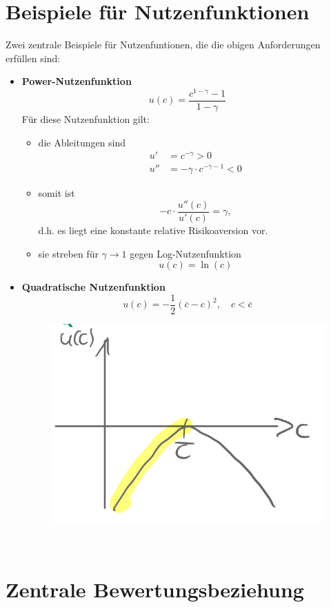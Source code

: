 \documentclass[12pt]{extreport} %
\theoremstyle{named}
\theoremstyle{nnamed}
\theoremstyle{itshape}
\theoremstyle{normal}
\begin{document}
\section{Beispiele für Nutzenfunktionen}
Zwei zentrale Beispiele für Nutzenfuntionen, die die obigen Anforderungen erfüllen sind:
\begin{itemize}
	\item \textbf{Power-Nutzenfunktion}
			$$ u(c) = \frac{c^{1-\gamma} - 1}{1 - \gamma} $$
			Für diese Nutzenfunktion gilt:
		\begin{itemize}
			\item die Ableitungen sind
				\begin{align*}
					u' & = c^{-\gamma} > 0 \\
					u'' & = - \gamma \cdot c ^{-\gamma - 1} < 0
				\end{align*}
			\item somit ist
				$$- c \cdot \frac{u''(c)}{u'(c)} = \gamma, $$
				d.h. es liegt eine konstante relative Risikoaversion vor.
			\item sie streben für $\gamma \rightarrow 1$ gegen Log-Nutzenfunktion
		$$ u(c) = \ln(c) $$
		\end{itemize}
	\item \textbf{Quadratische Nutzenfunktion}
			$$ u(c) = - \frac{1}{2} \left( \overline{c} - c \right)^2, \quad c < \overline{c} $$
			\begin{figure}[h!] \centering
				\includegraphics[scale=0.4]{img/p20}
			\end{figure}
\end{itemize}

~\newpage
\section{Zentrale Bewertungsbeziehung}
\end{document}

